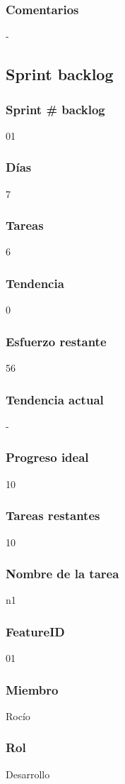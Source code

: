 \subsubsection{Comentarios}
-


\subsection{Sprint backlog}
\subsubsection{Sprint # backlog}
01
\subsubsection{Días}
7
\subsubsection{Tareas}
6
\subsubsection{Tendencia}
0
\subsubsection{Esfuerzo restante}
56
\subsubsection{Tendencia actual}
-
\subsubsection{Progreso ideal}
10
\subsubsection{Tareas restantes}
10
\subsubsection{Nombre de la tarea}
n1
\subsubsection{FeatureID}
01
\subsubsection{Miembro}
Rocío
\subsubsection{Rol}
Desarrollo
